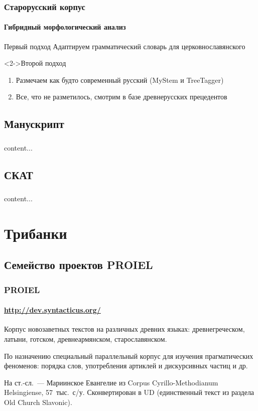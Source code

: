 \begin{frame}
  \frametitle{Старорусский корпус}
  \framesubtitle{Гибридный морфологический анализ}

  \begin{block}{Первый подход}
    Адаптируем грамматический словарь для церковнославянского
  \end{block}

  \begin{block}<2->{Второй подход}
    \begin{enumerate}
      \item Размечаем как будто современный русский (MyStem и TreeTagger)
      \item Все, что не разметилось, смотрим в базе древнерусских прецедентов
    \end{enumerate}
  \end{block}
\end{frame}

\subsection{Манускрипт}

\begin{frame}
  \frametitle{}
  content...
\end{frame}

\subsection{СКАТ}

\begin{frame}
  \frametitle{}
  content...
\end{frame}

\section{Трибанки}

\subsection{Семейство проектов PROIEL}

\begin{frame}
  \frametitle{PROIEL}
  \framesubtitle{\url{http://dev.syntacticus.org/}}

  Корпус новозаветных текстов на различных древних языках: древнегреческом, латыни, готском, древнеармянском, старославянском. \linebreak

  По назначению специальный параллельный корпус для изучения прагматических феноменов: порядка слов, употребления артиклей и дискурсивных частиц и др. \linebreak

  На ст.-сл.~--- Мариинское Евангелие из Corpus Cyrillo-Methodianum Helsingiense, 57~тыс.\ с/у. Сконвертирован в UD (единственный текст из раздела Old Church Slavonic).

\end{frame}

